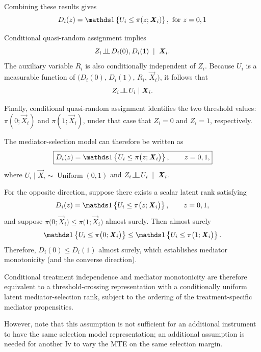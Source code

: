     Combining these results gives
\[
    D_i(z)
    =
    \indicator{
        U_i
        \leq
        \pi(z; \vec X_i)
    },
    \text{ for }
    z=0,1
\]

Conditional quasi-random assignment implies
\[
    Z_i
    \indep
        D_i(0),
        D_i(1)
    \;\mid\;
    \vec X_i.
\]
The auxiliary variable $R_i$ is also conditionally independent of $Z_i$.
Because $U_i$ is a measurable function of
$    \Big(D_i(0),
    \,
    D_i(1),
    \,
    R_i,
    \,
    \vec X_i \Big)$,
it follows that
\[
    Z_i
    \indep
    U_i
    \mid
    \vec X_i.
    \label{eqn:appendix-rank-treatment-independence}
\]

Finally, conditional quasi-random assignment identifies the two threshold values: $\pi(0; \vec X_i)$ and $\pi(1; \vec X_i)$, under that case that $Z_i = 0$ and $Z_i=1$, respectively.

The mediator-selection model can therefore be written as
\[
    \boxed{
    D_i(z)
    =
    \indicator{
        U_i
        \leq
        \pi
        \big(
            z;\vec X_i
        \big)
    },
    \qquad
    z=0,1,
    }
    \label{eqn:appendix-mediator-threshold-representation}
\]
where
$   U_i
    \mid
    \vec X_i
    \sim
    \operatorname{Uniform}(0,1)$
and
$    Z_i
    \indep
    U_i
    \; \mid \;
    \vec X_i$.

For the opposite direction, suppose there exists a scalar latent rank satisfying
\[
    D_i(z)
    =
    \indicator{
        U_i
        \leq
        \pi
        \big(
            z;\vec X_i
        \big)
    },
    \qquad
    z=0,1,
\]
and suppose $
    \pi
    \big(
        0;\vec X_i
    \big)
    \leq
    \pi
    \big(
        1;\vec X_i
    \big)$
almost surely.
Then almost surely
\[
    \indicator{
        U_i
        \leq
        \pi
        \big(
            0;\vec X_i
        \big)
    }
    \leq
    \indicator{
        U_i
        \leq
        \pi
        \big(
            1;\vec X_i
        \big)
    }.
\]
Therefore,
$D_i(0)
    \leq
    D_i(1)$
almost surely, which establishes mediator monotonicity (and the converse direction).

Conditional treatment independence and mediator monotonicity are therefore equivalent to a threshold-crossing representation with a conditionally uniform latent mediator-selection rank, subject to the ordering of the treatment-specific mediator propensities.

However, note that this assumption is not sufficient for an additional instrument to have the same selection model representation; an additional assumption is needed for another Iv to vary the MTE on the same selection margin.

